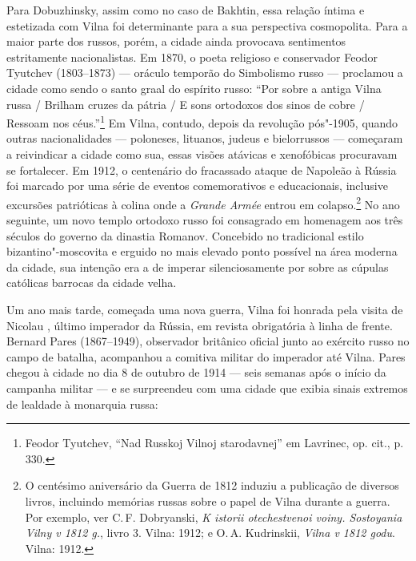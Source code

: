 Para Dobuzhinsky, assim como no caso de Bakhtin, essa relação íntima e
estetizada com Vilna foi determinante para a sua perspectiva
cosmopolita. Para a maior parte dos russos, porém, a cidade ainda
provocava sentimentos estritamente nacionalistas. Em 1870, o poeta
religioso e conservador Feodor Tyutchev (1803--1873) --- oráculo temporão
do Simbolismo russo --- proclamou a cidade como sendo o santo graal do
espírito russo: ``Por sobre a antiga Vilna russa / Brilham cruzes da
pátria / E sons ortodoxos dos sinos de cobre / Ressoam nos
céus.''\footnote{Feodor Tyutchev, ``Nad Russkoj Vilnoj starodavnej'' em Lavrinec, op. cit., p. 330.} Em Vilna, contudo, depois da revolução pós"-1905, quando outras nacionalidades --- poloneses, lituanos, judeus e
bielorrussos --- começaram a reivindicar a cidade como sua, essas visões
atávicas e xenofóbicas procuravam se fortalecer. Em 1912, o centenário
do fracassado ataque de Napoleão à Rússia foi marcado por uma série de
eventos comemorativos e educacionais, inclusive excursões patrióticas à
colina onde a \textit{Grande Armée} entrou em colapso.\footnote{O centésimo aniversário da Guerra de 1812 induziu a publicação de diversos livros, incluindo memórias russas sobre o papel de Vilna durante a guerra. Por exemplo, ver C.\,F. Dobryanski, \textit{K istorii otechestvenoi voiny. Sostoyania Vilny v 1812 g.}, livro 3. Vilna: 1912; e O.\,A. Kudrinskii, \textit{Vilna v 1812 godu}. Vilna: 1912.} No ano seguinte, um novo templo ortodoxo russo foi consagrado em homenagem aos três séculos do governo da dinastia
Romanov. Concebido no tradicional estilo bizantino"-moscovita e erguido
no mais elevado ponto possível na área moderna da cidade, sua intenção
era a de imperar silenciosamente por sobre as cúpulas católicas barrocas
da cidade velha.

Um ano mais tarde, começada uma nova guerra, Vilna foi honrada pela
visita de Nicolau , último imperador da Rússia, em revista obrigatória
à linha de frente. Bernard Pares (1867--1949), observador britânico
oficial junto ao exército russo no campo de batalha, acompanhou a
comitiva militar do imperador até Vilna. Pares chegou à cidade no dia 8
de outubro de 1914 --- seis semanas após o início da campanha militar --- e
se surpreendeu com uma cidade que exibia sinais extremos de lealdade à
monarquia russa:


